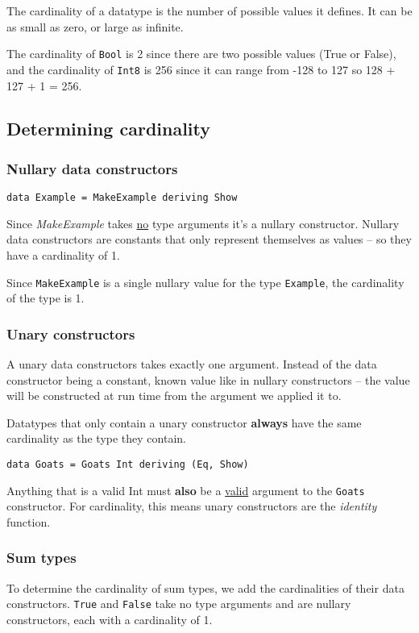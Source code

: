 The cardinality of a datatype is the number of possible values it defines. It can be as small as zero, or large as
infinite.

The cardinality of \texttt{Bool} is 2 since there are two possible values (True or False), and the cardinality of
\texttt{Int8} is 256 since it can range from -128 to 127 so 128 + 127 + 1 = 256.

\subsection{Determining cardinality}

\subsubsection{Nullary data constructors}
\begin{lstlisting}
data Example = MakeExample deriving Show
\end{lstlisting}

Since \emph{MakeExample} takes \underline{no} type arguments it's a nullary constructor.
Nullary data constructors are constants that only represent themselves as values -- so they have a cardinality of 1.

Since \texttt{MakeExample} is a single nullary value for the type \texttt{Example}, the cardinality of the type is 1.

\subsubsection{Unary constructors}
A unary data constructors takes exactly one argument. Instead of the data constructor being a constant, known value
like in nullary constructors -- the value will be constructed at run time from the argument we applied it to.

Datatypes that only contain a unary constructor \textbf{always} have the same cardinality as the type they contain.

\begin{lstlisting}
data Goats = Goats Int deriving (Eq, Show)
\end{lstlisting}

Anything that is a valid Int must \textbf{also} be a \underline{valid} argument to the \texttt{Goats} constructor.
For cardinality, this means unary constructors are the \emph{identity} function.

\subsubsection{Sum types}
To determine the cardinality of sum types, we add the cardinalities of their data constructors.
\texttt{True} and \texttt{False} take no type arguments and are nullary constructors, each with a cardinality of 1.

